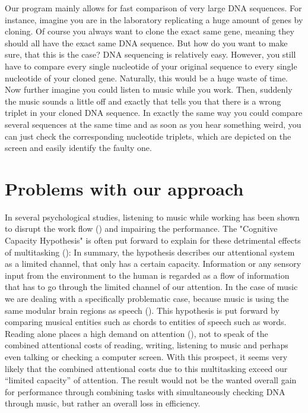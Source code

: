 \documentclass[10pt]{article}
\begin{document}
Our program mainly allows for fast comparison of very large DNA sequences. For instance, imagine you are in the laboratory replicating a huge amount of genes by cloning. Of course you always want to clone the exact same gene, meaning they should all have the exact same DNA sequence. But how do you want to make sure, that this is the case?
DNA sequencing is relatively easy. However, you still have to compare every single nucleotide of your original sequence to every single nucleotide of your cloned gene. Naturally, this would be a huge waste of time.
Now further imagine you could listen to music while you work. Then, suddenly the music sounds a little off and exactly that tells you that there is a wrong triplet in your cloned DNA sequence. In exactly the same way you could compare several sequences at the same time and as soon as you hear something weird, you can just check the corresponding nucleotide triplets, which are depicted on the screen and easily identify the faulty one. 

\section{Problems with our approach}
In several psychological studies, listening to music while working has been shown to disrupt the work flow (\cite{fast_loud}) and impairing the performance. The "Cognitive Capacity Hypothesis" is often put forward to explain for these detrimental effects of multitasking (\cite{baddley_2003}): In summary, the hypothesis describes our attentional system as a limited channel, that only has a certain capacity. Information or any sensory input from the environment to the human is regarded as a flow of information that has to go through the limited channel of our attention. In the case of music we are dealing with a specifically problematic case, because music is using the same modular brain regions as speech (\cite{peretez_colthearth_2003}). This hypothesis is put forward by comparing musical entities such as chords to entities of speech such as words. Reading alone places a high demand on attention (\cite{Carretti_Borella_Cornoldi_De_Beni_2009}), not to speak of the combined attentional costs of reading, writing, listening to music and perhaps even talking or checking a computer screen. With this prospect, it seems very likely that the combined attentional costs due to this multitasking exceed our “limited capacity” of attention. The result would not be the wanted overall gain for performance through combining tasks with simultaneously checking DNA through music, but rather an overall loss in efficiency.
\end{document}
